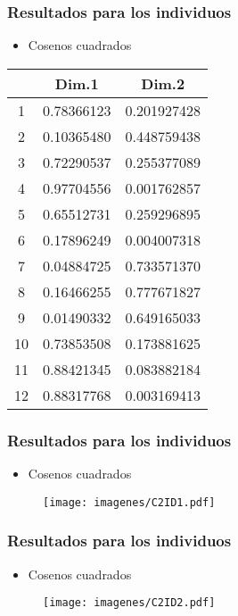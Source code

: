 \documentclass[12pt]{beamer}
\begin{document}
\begin{frame}
\frametitle{Resultados para los individuos}
\begin{itemize}
\item Cosenos cuadrados
\end{itemize}
\begin{center}
\begin{tabular}{|c|c|c|}
\hline
 & Dim.1  &     Dim.2 \\
\hline
1 & 0.78366123& 0.201927428 \\
2 & 0.10365480& 0.448759438\\
3 & 0.72290537& 0.255377089\\
4 & 0.97704556& 0.001762857\\
5 & 0.65512731& 0.259296895\\
6 & 0.17896249& 0.004007318\\
7 & 0.04884725& 0.733571370\\
8 & 0.16466255& 0.777671827\\
9 & 0.01490332& 0.649165033\\
10& 0.73853508& 0.173881625\\
11& 0.88421345& 0.083882184\\
12& 0.88317768& 0.003169413\\
\hline
\end{tabular}
\end{center}
\end{frame}

\begin{frame}
\frametitle{Resultados para los individuos}
\begin{itemize}
\item Cosenos cuadrados
\end{itemize}
\begin{figure}[h]
  \centering
  \texttt{[image: imagenes/C2ID1.pdf]}
\end{figure}
\end{frame}

\begin{frame}
\frametitle{Resultados para los individuos}
\begin{itemize}
\item Cosenos cuadrados
\end{itemize}
\begin{figure}[h]
  \centering
  \texttt{[image: imagenes/C2ID2.pdf]}
\end{figure}
\end{frame}
\end{document}
